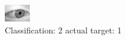 \begin{figure}[h!]
\begin{center}
\includegraphics[width=0.60\columnwidth]{figures/ID2763_class_2_target_1.png}
\end{center}
\caption{ Classification: 2 actual target: 1}
\label{fig:ID2763_class_2_target_1}
\end{figure}
